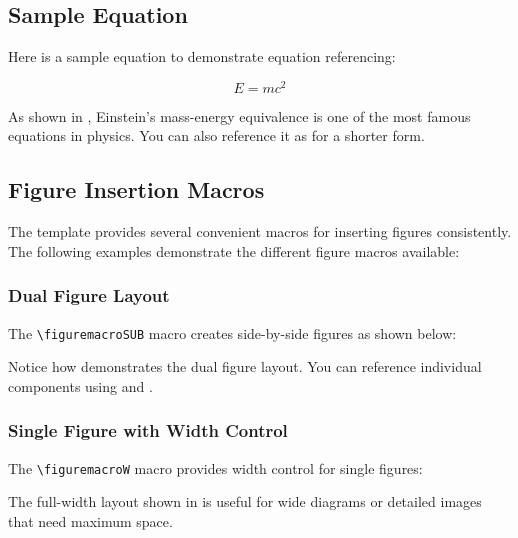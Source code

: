 \subsection{Sample Equation}
Here is a sample equation to demonstrate equation referencing:

\begin{equation}
    E = mc^2
    \label{eqn:sampleequation}
\end{equation}

As shown in , Einstein's mass-energy equivalence is one of the most famous equations in physics. You can also reference it as  for a shorter form.

\subsection{Figure Insertion Macros}
\label{sect:figmacros}

The template provides several convenient macros for inserting figures consistently. The following examples demonstrate the different figure macros available:

\subsubsection{Dual Figure Layout}
The \texttt{\textbackslash figuremacroSUB} macro creates side-by-side figures as shown below:


Notice how  demonstrates the dual figure layout. You can reference individual components using  and .

\subsubsection{Single Figure with Width Control}
The \texttt{\textbackslash figuremacroW} macro provides width control for single figures:


The full-width layout shown in  is useful for wide diagrams or detailed images that need maximum space.

